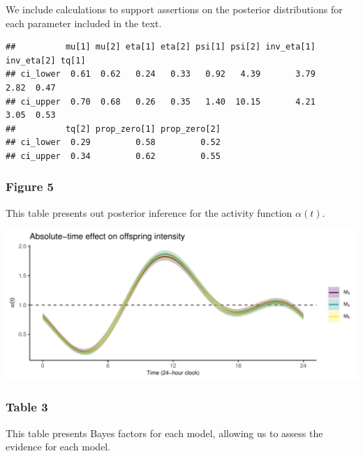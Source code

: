 \documentclass[
]{article}
\begin{document}
We include calculations to support assertions on the posterior
distributions for each parameter included in the text.

\begin{verbatim}
##          mu[1] mu[2] eta[1] eta[2] psi[1] psi[2] inv_eta[1] inv_eta[2] tq[1]
## ci_lower  0.61  0.62   0.24   0.33   0.92   4.39       3.79       2.82  0.47
## ci_upper  0.70  0.68   0.26   0.35   1.40  10.15       4.21       3.05  0.53
##          tq[2] prop_zero[1] prop_zero[2]
## ci_lower  0.29         0.58         0.52
## ci_upper  0.34         0.62         0.55
\end{verbatim}

\hypertarget{figure-5}{%
\subsubsection{Figure 5}\label{figure-5}}

This table presents out posterior inference for the activity function
\(\alpha (t)\).

\includegraphics{figures_and_tables_files/figure-latex/alpha_inference-1.pdf}

\hypertarget{table-3}{%
\subsubsection{Table 3}\label{table-3}}

This table presents Bayes factors for each model, allowing us to assess
the evidence for each model.
\end{document}
